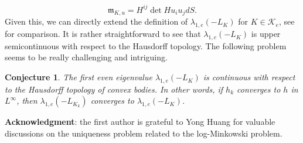 \documentclass[reqno]{amsart}
\theoremstyle{remark}
\def\cK{{\mathcal K}}
\theoremstyle{plain}
\newtheorem{conj}{Conjecture}
\begin{document}
\[
\mathfrak{m}_{K, u}=H^{ij}\det{H} u_iu_j dS.
\]
 Given this, we can directly extend the definition of $\lambda_{1, e}(-L_K)$ for $K\in \cK_e$,  see \cite[Section 1.4]{Milman22} for comparison. 
It is rather straightforward to see that $\lambda_{1, e}(-L_K)$ is upper semicontinuous with respect to the Hausdorff topology.
The following problem seems to be really challenging and intriguing. 
\begin{conj}
    The first even eigenvalue $\lambda_{1, e}(-L_K)$ is continuous with respect to the Hausdorff topology of convex bodies. In other words, if $h_k$ converges to $h$ in $L^\infty$, then $\lambda_{1, e}(-L_{K_k})$ converges to $\lambda_{1, e}(-L_K)$. 
\end{conj}



{\bf Acknowledgment}: the first author is grateful to Yong Huang for valuable discussions on the uniqueness problem related to the log-Minkowski problem.

\end{document}
